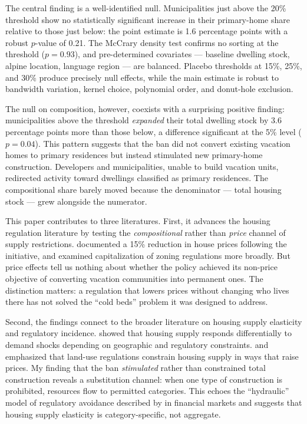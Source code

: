 \documentclass[12pt]{article}
\begin{document}
The central finding is a well-identified null. Municipalities just above the 20\% threshold show no statistically significant increase in their primary-home share relative to those just below: the point estimate is 1.6 percentage points with a robust $p$-value of 0.21. The McCrary density test confirms no sorting at the threshold ($p = 0.93$), and pre-determined covariates --- baseline dwelling stock, alpine location, language region --- are balanced. Placebo thresholds at 15\%, 25\%, and 30\% produce precisely null effects, while the main estimate is robust to bandwidth variation, kernel choice, polynomial order, and donut-hole exclusion.

The null on composition, however, coexists with a surprising positive finding: municipalities above the threshold \textit{expanded} their total dwelling stock by 3.6 percentage points more than those below, a difference significant at the 5\% level ($p = 0.04$). This pattern suggests that the ban did not convert existing vacation homes to primary residences but instead stimulated new primary-home construction. Developers and municipalities, unable to build vacation units, redirected activity toward dwellings classified as primary residences. The compositional share barely moved because the denominator --- total housing stock --- grew alongside the numerator.

This paper contributes to three literatures. First, it advances the housing regulation literature by testing the \textit{compositional} rather than \textit{price} channel of supply restrictions. \citet{hilber2020zweitwohnungsinitiative} documented a 15\% reduction in house prices following the initiative, and \citet{buechler2024capitalizing} examined capitalization of zoning regulations more broadly. But price effects tell us nothing about whether the policy achieved its non-price objective of converting vacation communities into permanent ones. The distinction matters: a regulation that lowers prices without changing who lives there has not solved the ``cold beds'' problem it was designed to address.

Second, the findings connect to the broader literature on housing supply elasticity and regulatory incidence. \citet{saiz2010geographic} showed that housing supply responds differentially to demand shocks depending on geographic and regulatory constraints. \citet{glaeser2005urban} and \citet{gyourko2008new} emphasized that land-use regulations constrain housing supply in ways that raise prices. My finding that the ban \textit{stimulated} rather than constrained total construction reveals a substitution channel: when one type of construction is prohibited, resources flow to permitted categories. This echoes the ``hydraulic'' model of regulatory avoidance described by \citet{buchak2018fintech} in financial markets and suggests that housing supply elasticity is category-specific, not aggregate.
\end{document}
